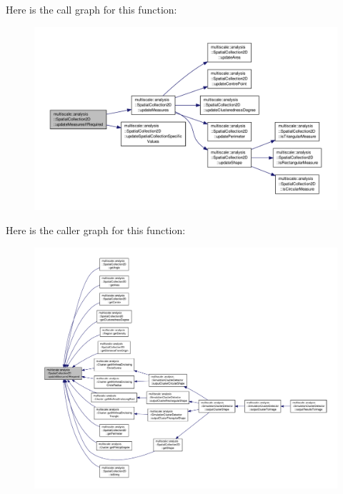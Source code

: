 Here is the call graph for this function\-:\nopagebreak
\begin{figure}[H]
\begin{center}
\leavevmode
\includegraphics[width=350pt]{classmultiscale_1_1analysis_1_1SpatialCollection2D_a731de1009ba24b4fda5003c9cec5196c_cgraph}
\end{center}
\end{figure}




Here is the caller graph for this function\-:\nopagebreak
\begin{figure}[H]
\begin{center}
\leavevmode
\includegraphics[width=350pt]{classmultiscale_1_1analysis_1_1SpatialCollection2D_a731de1009ba24b4fda5003c9cec5196c_icgraph}
\end{center}
\end{figure}


